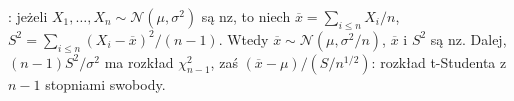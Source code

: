 :  jeżeli $X_1, \ldots, X_n \sim \mathcal N(\mu, \sigma^2)$ są nz, to niech $\overline x = \sum_{i \le n} X_i / n$, $S^2 = \sum_{i \le n} (X_i - \overline x)^2 / (n-1)$.
Wtedy $\overline x \sim \mathcal N(\mu, \sigma^2/n)$, $\overline x$ i $S^2$ są nz.
Dalej, $(n-1) S^2 / \sigma^2$ ma rozkład $\chi^2_{n-1}$, zaś $(\overline x - \mu) / (S / n^{1/2})$: rozkład t-Studenta z $n-1$ stopniami swobody.